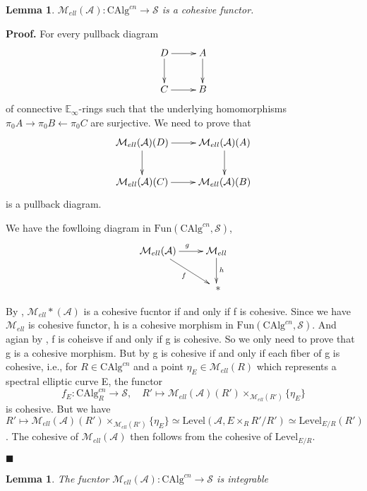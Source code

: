 \documentclass[12pt]{article}
\newtheorem{lemma}[theorem]{Lemma}
\theoremstyle{thry}
\renewenvironment{proof}
{\par \noindent \textbf{Proof.}}
{ \par \hfill $\blacksquare$ \quad \par }
\def  \CAlg     {\mathrm{CAlg}}
\def  \Fun      {\mathrm{Fun}}
\def  \Level    {\mathrm{Level}}
\def  \ca       {\mathcal{A}}
\def  \cm       {\mathcal{M}}
\def  \cs       {\mathcal{S}}
\def  \be       {\mathbb{E}}
\begin{document}
\begin{lemma}
	$\cm_{ell}(\ca): \CAlg^{cn} \to  \cs$  is a cohesive  functor.
\end{lemma}


\begin{proof}
	For every pullback diagram
	$$
	\xymatrix{
		D \ar[r]  \ar[d]  &  A  \ar[d]  \\
		C  \ar[r]    &   B 
	}
	$$ 
	of connective $\be_{\infty}$-rings such  that the underlying homomorphisms $\pi_0 A \to \pi_0 B   \leftarrow \pi_0 C$ are surjective. We need to prove that
	$$
	\xymatrix{
		\cm_{ell}(\ca)(D)\ar[r]  \ar[d]  &    \cm_{ell}(\ca)(A)  \ar[d]  \\
		\cm_{ell}(\ca)(C) \ar[r]   &    \cm_{ell}(\ca)(B)   \\
	}
	$$ 
	is a pullback diagram. 
	
	We have the fowlloing diagram in $\Fun(\CAlg^{cn}, \cs)$,
	$$
	\xymatrix{
		\cm_{ell}(\ca)  \ar[r]^{g} \ar[rd]_{f}  &  \cm_{ell}  \ar[d]^{h} \\
		&   \ *   \\
	}
	$$
	
	By \cite[Remark 17.3.7.3]{lu-SAG}, $\cm_{ell}*(\ca)$ is a cohesive fucntor if and only if f is cohesive. Since we  have $\cm_{ell}$ is cohesive functor, h is a cohesive morphism in $\Fun(\CAlg^{cn}, \cs)$. And agian by \cite[Remark 17.3.7.3]{lu-SAG}, f is coheisve if and only if g is cohesive. So we only need to prove that g is a cohesive morphism. But by \cite[Proposition 17.3.8.4]{lu-SAG}  g is cohesive  if  and only if each fiber of g is cohesive, i.e., for $R \in \CAlg^{cn}$ and a point $\eta_E \in \cm_{ell}(R)$ which represents a spectral elliptic curve E,  the functor
	$$
	f_{E}: \CAlg^{cn}_R \to \cs, \quad   R' \mapsto  \cm_{ell}(\ca)(R') \times_{\cm_{ell}(R')}\{\eta_E\}
	$$
	is cohesive. But we have $R' \mapsto  \cm_{ell}(\ca)(R') \times_{\cm_{ell}(R')}\{\eta_E\} \simeq \Level(\ca, E \times_R R'/R') \simeq \Level_{E/R}(R')$.  The cohesive of $\cm_{ell}(\ca)$  then follows from the cohesive of $\Level_{E/R}$.
	
\end{proof}



\begin{lemma}
	The fucntor $\cm_{ell}(\ca): \CAlg^{cn} \to  \cs$  is integrable
\end{lemma}
\end{document}
